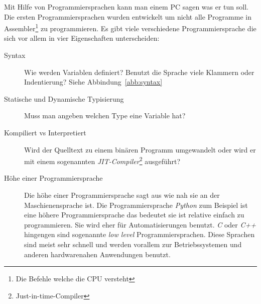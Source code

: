 \documentclass[a4paper, ngerman, 11pt]{scrartcl}
\begin{document}
Mit Hilfe von Programmiersprachen kann man einem PC sagen was er tun soll.
Die ersten Programmiersprachen wurden entwickelt um nicht alle Programme in Assembler\footnote{Die Befehle welche die CPU versteht} zu programmieren.
Es gibt viele verschiedene Programmiersprache die sich vor allem in vier Eigenschaften unterscheiden:

\begin{description}
	\item[Syntax] Wie werden Variablen definiert? Benutzt die Sprache viele Klammern oder Indentierung? Siehe Abbindung~\ref{abb:syntax}
	\item[Statische und Dynamische Typisierung] Muss man angeben welchen Type eine Variable hat?
	\item[Kompiliert vs Interpretiert] Wird der Quelltext zu einem binären Programm umgewandelt oder wird er mit einem sogenannten \textit{JIT-Compiler}\footnote{Just-in-time-Compiler} ausgeführt?
	\item[Höhe einer Programmiersprache] Die höhe einer Programmiersprache sagt aus wie nah sie an der Maschienensprache ist. Die Programmiersprache \emph{Python} zum Beispiel ist eine höhere Programmiersprache das bedeutet sie ist relative einfach zu programmieren. Sie wird eher für Automatisierungen benutzt. \emph{C} oder \emph{C++} hingengen sind sogenannte \emph{low level} Programmiersprachen. Diese Sprachen sind meist sehr schnell und werden vorallem zur Betriebssystemen und anderen hardwarenahen Anwendungen benutzt.
\end{description}
\end{document}

